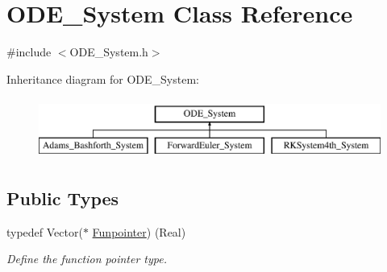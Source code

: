 \hypertarget{class_o_d_e___system}{}\section{O\+D\+E\+\_\+\+System Class Reference}
\label{class_o_d_e___system}


{\ttfamily \#include $<$O\+D\+E\+\_\+\+System.\+h$>$}

Inheritance diagram for O\+D\+E\+\_\+\+System\+:\begin{figure}[H]
\begin{center}
\leavevmode
\includegraphics[height=2.000000cm]{class_o_d_e___system}
\end{center}
\end{figure}
\subsection*{Public Types}
\begin{DoxyCompactItemize}
\item 
\mbox{\label{class_o_d_e___system_a9ff6775dafbba78d49f164174aa7074e}} 
typedef Vector($\ast$ \mbox{\hyperlink{class_o_d_e___system_a9ff6775dafbba78d49f164174aa7074e}{Funpointer}}) (Real)
\begin{DoxyCompactList}\small\item\em Define the function pointer type. \end{DoxyCompactList}\end{DoxyCompactItemize}
